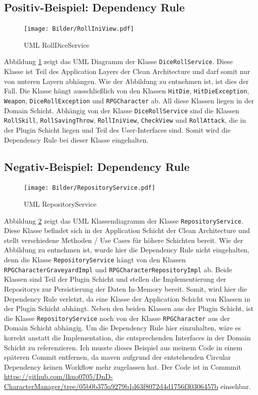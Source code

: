 \subsection{Positiv-Beispiel: Dependency Rule}
\begin{figure}[H]
	\centering
	\texttt{[image: Bilder/RollIniView.pdf]}
	\caption{UML RollDiceService}
	\label{fig:RollDiceServiceDependencys}
\end{figure}
Abbildung \ref{fig:RollDiceServiceDependencys} zeigt das UML Diagramm der Klasse \texttt{DiceRollService}. Diese Klasse ist Teil des Application Layers der Clean Architecture und darf somit nur von unteren Layern abhängen. Wie der Abbildung zu entnehmen ist, ist dies der Fall. Die Klasse hängt ausschließlich von den Klassen \texttt{HitDie}, \texttt{HitDieException}, \texttt{Weapon}, \texttt{DiceRollException} und \texttt{RPGCharacter} ab. All diese Klassen liegen in der Domain Schicht. Abhängig von der Klasse \texttt{DiceRollService} sind die Klassen \texttt{RollSkill}, \texttt{RollSavingThrow}, \texttt{RollIniView}, \texttt{CheckView} und \texttt{RollAttack}, die in der Plugin Schicht liegen und Teil des User-Interfaces sind. Somit wird die Dependency Rule bei dieser Klasse eingehalten.


\subsection{Negativ-Beispiel: Dependency Rule}
\begin{figure}[H]
	\centering
	\texttt{[image: Bilder/RepositoryService.pdf]}
	\caption{UML RepositoryService}
	\label{fig:RepositoryService}
\end{figure}
Abbildung \ref{fig:RepositoryService} zeigt das UML Klassendiagramm der Klasse \texttt{RepositoryService}. Diese Klasse befindet sich in der Application Schicht der Clean Architecture und stellt verschiedene Methoden / Use Cases für höhere Schichten bereit. Wie der Abbildung zu entnehmen ist, wurde hier die Dependency Rule nicht eingehalten, denn die Klasse \texttt{RepositoryService} hängt von den Klassen \texttt{RPGCharacterGraveyardImpl} und \texttt{RPGCharacterRepositoryImpl} ab. Beide Klassen sind Teil der Plugin Schicht und stellen die Implementierung der Repositorys zur Persistierung der Daten In-Memory bereit. Somit, wird hier die Dependency Rule verletzt, da eine Klasse der Application Schicht von Klassen in der Plugin Schicht abhängt. Neben den beiden Klassen aus der Plugin Schicht, ist die Klasse \texttt{RepositoryService} noch von der Klasse \texttt{RPGCharacter} aus der Domain Schicht abhängig. Um die Dependency Rule hier einzuhalten, wäre es korrekt anstatt die Implementation, die entsprechenden Interfaces in der Domain Schicht zu referenzieren.
Ich musste dieses Beispiel aus meinem Code in einem späteren Commit entfernen, da maven aufgrund der entstehenden Circular Dependency keinen Workflow mehr zugelassen hat. Der Code ist in Commmit \href{https://github.com/lkno0705/DnD-CharacterManager/tree/05b0b375a9279b1d63f8072d4d1756f30306457b}{https://github.com/lkno0705/DnD-CharacterManager/tree/05b0b375a9279b1d63f8072d4d1756f30306457b} einsehbar.

